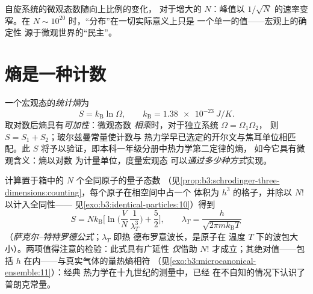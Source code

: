 \begin{omfigure}

{\small 自旋系统的微观态数随向上比例的变化，
对于增大的 $N$：峰值以 $1/\sqrt N$ 的速率变窄。在 $N \sim
10^{20}$ 时，“分布”在一切实际意义上只是
一个单一的值——宏观上的确定性
源于微观世界的“民主”。}
\end{omfigure}

\section{熵是一种计数}

\begin{definition}[玻尔兹曼熵]\label{def:b3:microcanonical-ensemble:entropy}
一个宏观态的\emph{统计熵}为
\[
S = k_{\text{B}}\ln\Omega , \qquad
k_{\text{B}} = \qty{1.38e-23}{J/K} .
\]
取对数后熵具有\emph{可加性}：微观态数
\emph{相乘}时，对于独立系统 $\Omega = \Omega_1\Omega_2$，
则 $S = S_1 + S_2$；玻尔兹曼常量使计数与
热力学早已选定的开尔文与焦耳单位相匹配。此
$S$ 将予以验证，即本科一年级分册中热力学第二定律的熵，
如今它具有微观含义：熵以对数
为计量单位，度量宏观态
可以\emph{通过多少种方式}实现。
\end{definition}

\begin{proposition}[理想气体的熵]\label{prop:b3:microcanonical-ensemble:gas}
计算置于箱中的 $N$ 个全同原子的量子态数
（见\cref{prop:b3:schrodinger-three-dimensions:counting}，每个原子在相空间中占一个
体积为 $h^3$ 的格子，并除以 $N!$ 以计入全同性——
见\cref{exo:b3:identical-particles:10}）得到
\[
S = Nk_{\text{B}}\Big[\ln\Big(\frac VN\,\frac1{\lambda_T^3}\Big)
 + \frac52\Big] , \qquad
\lambda_T = \frac{h}{\sqrt{2\pi mk_{\text{B}}T}}
\]
（\emph{萨克尔–特特罗德公式}；$\lambda_T$ 即热
德布罗意波长，是原子在
温度 $T$ 下的波包大小）。两项值得注意的检验：此式具有广延性
\emph{仅}借助 $N!$ 才成立；其绝对值——包括
$h$ 在内——与真实气体的量热熵相符
（见\cref{exo:b3:microcanonical-ensemble:11}）：经典
热力学在十九世纪的测量中，已经
在不自知的情况下认识了普朗克常量。
\end{proposition}
\admitted

